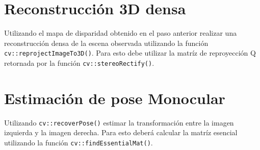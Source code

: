 \documentclass[tp]{lcc}
\begin{document}
\section{Reconstrucción 3D densa}
Utilizando el mapa de disparidad obtenido en el paso anterior realizar una reconstrucción densa de la escena observada utilizando la función \lstinline{cv::reprojectImageTo3D()}. Para esto debe utilizar la matríz de reproyección Q retornada por la función \lstinline{cv::stereoRectify()}.

\section{Estimación de pose Monocular}
Utilizando \lstinline{cv::recoverPose()} estimar la transformación entre la imagen izquierda y la imagen derecha. Para esto deberá calcular la matríz esencial utilizando la función \lstinline{cv::findEssentialMat()}.
\end{document}
